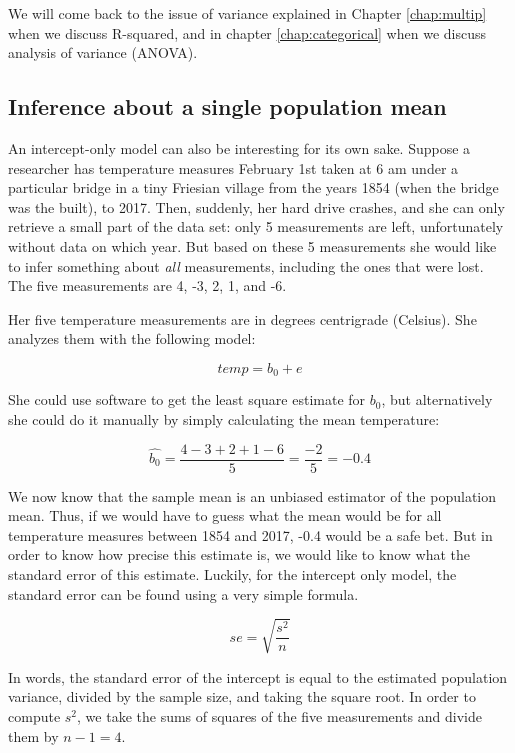 \documentclass[]{book}\usepackage[]{graphicx}\usepackage[]{color}
\begin{document}
We will come back to the issue of variance explained in Chapter \ref{chap:multip} when we discuss R-squared, and in chapter \ref{chap:categorical} when we discuss analysis of variance (ANOVA).


 
\subsection{Inference about a single population mean}

An intercept-only model can also be interesting for its own sake. Suppose a researcher has temperature measures February 1st taken at 6 am under a particular bridge in a tiny Friesian village from the years 1854 (when the bridge was the built), to 2017. Then, suddenly, her hard drive crashes, and she can only retrieve a small part of the data set: only 5 measurements are left, unfortunately without data on which year. But based on these 5 measurements she would like to infer something about \textit{all} measurements, including the ones that were lost. The five measurements are 4, -3, 2, 1, and -6.

Her five temperature measurements are in degrees centrigrade (Celsius). She analyzes them with the following model:

\begin{equation}
temp = b_0 + e
\end{equation}

She could use software to get the least square estimate for $b_0$, but alternatively she could do it manually by simply calculating the mean temperature:

\begin{equation}
\hat{b_0} = \frac{4-3+2+1-6}{5} = \frac{-2}{5} = -0.4
\end{equation}

We now know that the sample mean is an unbiased estimator of the population mean. Thus, if we would have to guess what the mean would be for all temperature measures between 1854 and 2017, -0.4 would be a safe bet. But in order to know how precise this estimate is, we would like to know what the standard error of this estimate. Luckily, for the intercept only model, the standard error can be found using a very simple formula. 

\begin{equation}
se = \sqrt{\frac{s^2}{n}}
\end{equation}

In words, the standard error of the intercept is equal to the estimated population variance, divided by the sample size, and taking the square root. In order to compute $s^2$, we take the sums of squares of the five measurements and divide them by $n-1=4$. 
\end{document}
